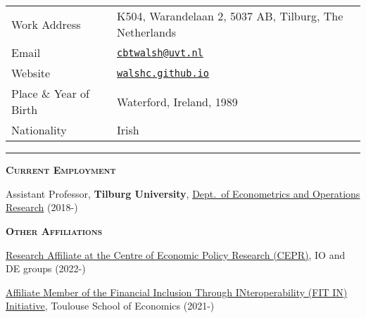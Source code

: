\documentclass[11pt,overlapped,line,letterpaper]{article}
\newcommand{\cvsec}[1]{\vspace{\baselineskip}\textbf{\textsc{#1}}}
\newcommand{\name}[1]{\textsc{\textrm{\textbf{{\fontsize{16}{20}\selectfont{#1}}}}}\\}
\newenvironment{list1}{
  \begin{list}{\ding{113}}{%
      \setlength{\itemsep}{0in}\setlength{\itemindent}{-1.5em}
      \setlength{\parsep}{0in}\setlength{\parskip}{0in}
      \setlength{\topsep}{0in}\setlength{\partopsep}{0in}
      \setlength{\leftmargin}{0.5in}}}{\end{list}}
\begin{document}
\name{Christoph Walsh} \\
\hspace{-2.3mm}\begin{tabular}{ll}
  Work Address      & K504, Warandelaan 2, 5037 AB, Tilburg, The Netherlands \\
  Email        & \href{mailto:cbtwalsh@uvt.nl}{\texttt{cbtwalsh@uvt.nl}} \\
  Website      & \href{https://walshc.github.io}{\texttt{walshc.github.io}} \\
  Place \& Year of Birth & Waterford, Ireland, 1989 \\
  Nationality & Irish \\
\end{tabular}
\smallskip

\rule{\textwidth}{0.4pt}

\cvsec{Current Employment}
\begin{list1}
\item[] Assistant Professor, \textbf{Tilburg University}, \href{https://www.tilburguniversity.edu/about/schools/economics-and-management/organization/departments/eor/faculty}{Dept.~of Econometrics and Operations Research} (2018-)
\end{list1}

\cvsec{Other Affiliations}
\begin{list1}
\item[] \href{https://cepr.org/about/people/christoph-walsh}{Research Affiliate at the Centre of Economic Policy Research (CEPR)}, IO and DE groups (2022-)
\item[] \href{https://www.tse-fr.eu/groups/FIT-IN-Initiative?tabs=2}{Affiliate Member of the Financial Inclusion Through INteroperability (FIT IN) Initiative}, Toulouse School of Economics (2021-)
\end{list1}

\end{document}
